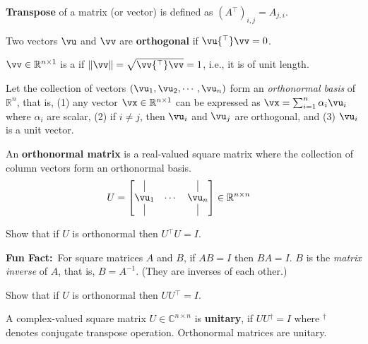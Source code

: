 \documentclass[a4paper,11pt]{exam}
\newcounter{ct}
\newcommand{\inv}{^{-1}}
\newcommand{\trp}{{^\top}} %
\newcommand{\ctrp}{{^\dagger}} %
\newcommand{\norm}[1]{\ensuremath{\Vert{#1}\Vert}}
\newcommand{\field}[1]{\ensuremath{\mathbb{#1}}}
\newcommand{\reals}{\field{R}}
\newcommand{\complex}{\field{C}}
\newcommand{\funfact}{\textbf{Fun Fact:}~}
\begin{document}
\begin{questions}
\begin{tcolorbox}
    \textbf{Transpose} of a matrix (or vector) is defined as $(A\trp)_{i,j} = A_{j,i}$.
\end{tcolorbox}
\begin{tcolorbox}
    Two vectors $\vu$ and $\vv$ are \textbf{orthogonal} if $\vu\trp \vv = 0$.
\end{tcolorbox}
\begin{tcolorbox}
    $\vv \in \reals^{n \times 1}$ is a  if $\norm{\vv} = \sqrt{\vv\trp \vv} = 1$, i.e., it is of unit length.
\end{tcolorbox}

Let the collection of vectors $(\vu_1, \vu_2, \cdots, \vu_n)$ form an \textit{orthonormal basis} of $\reals^n$, that is,
(1) any vector $\vx \in \reals^{n \times 1}$ can be expressed as $\vx = \sum_{i=1}^n \alpha_i \vu_i$ where $\alpha_i$ are scalar,
(2) if $i \neq j$, then $\vu_i$ and $\vu_j$ are orthogonal,
and
(3) $\vu_i$ is a unit vector.

An \textbf{orthonormal matrix} is a real-valued square matrix where the collection of column vectors form an orthonormal basis.
\begin{align}\label{eq:LA:orthonormal}
U &=
    \begin{bmatrix}
	\kern.3em\vline\kern.3em
	&
	&
	\kern.3em\vline\kern.3em
	\\
	\vu_1 & \cdots & \vu_n \\
	\kern.3em\vline\kern.3em
	&
	&
	\kern.3em\vline\kern.3em
    \end{bmatrix}
    \in \reals^{n \times n}
\end{align}

\clearpage
\question Show that if $U$ is orthonormal then $U\trp U = I$.

\begin{tcolorbox}
    \funfact For square matrices $A$ and $B$, if $AB=I$ then $BA=I$.
    $B$ is the \textit{matrix inverse} of $A$, that is, $B = A\inv$.
    (They are inverses of each other.)
\end{tcolorbox}
\question Show that if $U$ is orthonormal then $U U\trp = I$.

A complex-valued square matrix $U \in \complex^{n \times n}$ is \textbf{unitary}, if $U U\ctrp = I$ where $\ctrp$ denotes conjugate transpose operation.
Orthonormal matrices are unitary.


\end{questions}
\end{document}
